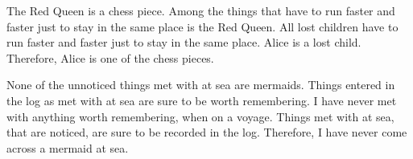 {\begin{exercises}
\item The Red Queen is a chess piece. Among the things that have to run faster and faster just to stay in the same place is the Red Queen. All lost children have to run faster and faster just to stay in the same place. Alice is a lost child. Therefore, Alice is one of the chess pieces. 


\item \label{itm:mermaids} None of the unnoticed things met with at sea are mermaids. Things entered in the log as met with at sea are sure to be worth remembering. I have never met with anything worth remembering, when on a voyage. Things met with at sea, that are noticed, are sure to be recorded in the log. Therefore, I have never come across a mermaid at sea. %







\end{exercises}}
